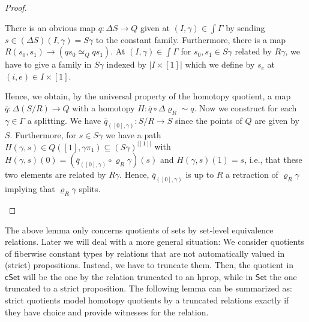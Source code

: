 \documentclass[10pt,a4paper]{article}
\theoremstyle{definition}
\theoremstyle{remark}
\newcommand{\Set}{\mathsf{Set}}
\newcommand{\cSet}{\mathsf{cSet}}
\begin{document}
\begin{proof}
\begin{description}[font=\normalfont,leftmargin=0cm]
    There is an obvious map \(q \colon \Delta S \to Q\) given at \((I, \gamma) \in \int\Gamma\) by sending \(s \in (\Delta S)(I, \gamma) = S\gamma\) to the constant family.
    Furthermore, there is a map \(R(s_0, s_1) \to (qs_0 \simeq_{Q} qs_1)\).
    At \((I, \gamma) \in \int\Gamma\) for \(s_0, s_1 \in S\gamma\) related by \(R\gamma\), we have to give a family in \(S\gamma\) indexed by \(|I \times [1]|\) which we define by \(s_e\) at \((i, e) \in I \times [1]\).

    Hence, we obtain, by the universal property of the homotopy quotient, a map \(\overline q \colon \Delta(S/R) \to Q\) with a homotopy \(H \colon \overline q \circ \Delta\varrho_R \sim q\).
    Now we construct for each \(\gamma \in \Gamma\) a splitting.
    We have \(\overline{q}_{([0], \gamma)} \colon S/R \to S\) since the points of \(Q\) are given by \(S\).
    Furthermore, for \(s \in S\gamma\) we have a path \(H(\gamma, s) \in Q([1], \gamma\pi_1) \subseteq {(S\gamma)}^{|[1]|}\) with \(H(\gamma, s)(0) = (\overline{q}_{([0], \gamma)} \circ \varrho_R\gamma)(s)\) and \(H(\gamma, s)(1) = s\), i.e., that these two elements are related by \(R\gamma\).
    Hence, \(\overline{q}_{([0], \gamma)}\) is up to \(R\) a retraction of \(\varrho_R\gamma\) implying that \(\varrho_R\gamma\) splits. \qedhere
  \end{description}
\end{proof}


The above lemma only concerns quotients of sets by set-level equivalence relations.
Later we will deal with a more general situation: We consider quotients of fiberwise constant types by relations that are not automatically valued in (strict) propositions.
Instead, we have to truncate them.
Then, the quotient in \(\cSet\) will be the one by the relation truncated to an hprop, while in \(\Set\) the one truncated to a strict proposition.
The following lemma can be summarized as: strict quotients model homotopy quotients by a truncated relations exactly if they have choice and provide witnesses for the relation.
\end{document}
